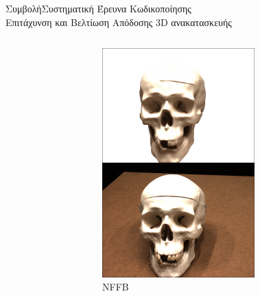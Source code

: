 \documentclass[10pt]{beamer}
\begin{document}
\begin{frame}{Συμβολή}{Συστηματική Έρευνα Κωδικοποίησης \\ Επιτάχυνση και Βελτίωση Απόδοσης 3D ανακατασκευής}
{\begin{columns}
\begin{figure}
            \end{figure}
            \begin{figure}
                \centering
                \includegraphics[height=.42\textheight]{images/RenderComparison65/NFFB/rendering_100.jpg}
                \caption{\tiny{NFFB}}
            \end{figure}
            \begin{figure}
                \centering

\end{figure}
\end{columns}}
\end{frame}
\end{document}
